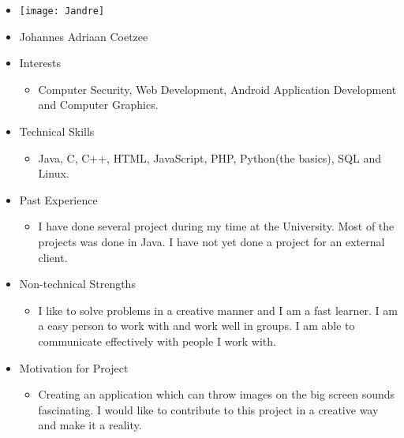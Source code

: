 
\begin{itemize}
	\item[] \texttt{[image: Jandre]}
	\item[] Johannes Adriaan Coetzee
	\item Interests
	\begin{itemize}
		\item[] Computer Security, Web Development, Android Application Development and Computer Graphics.
	\end{itemize}
	\item Technical Skills
	\begin{itemize}
		\item[] Java, C, C++, HTML, JavaScript, PHP, Python(the basics), SQL and Linux.
	\end{itemize}
	\item Past Experience
	\begin{itemize}
		\item[] I have done several project during my time at the University. Most of the projects was done in Java. I have not yet done a project for an external client.
	\end{itemize}
	\item Non-technical Strengths
	\begin{itemize}
		\item[] I like to solve problems in a creative manner and I am a fast learner. I am a easy person to work with and work well in groups. I am able to communicate effectively with people I work with.
	\end{itemize}
	\item Motivation for Project
	\begin{itemize}
		\item[] Creating an application which can throw images on the big screen sounds fascinating. I would like to contribute to this project in a creative way and make it a reality. 
	\end{itemize}
\end{itemize}